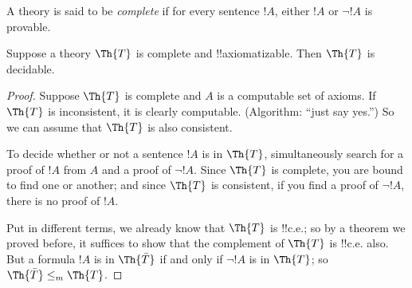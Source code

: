 \documentclass[../../../include/open-logic-section]{subfiles}
\begin{document}


A theory is said to be {\em complete} if for every sentence $!A$,
either $!A$ or $\lnot !A$ is provable.

\begin{lem}
Suppose a theory $\Th{T}$ is complete and !!{axiomatizable}. Then
$\Th{T}$ is decidable.
\end{lem}

\begin{proof}
Suppose $\Th{T}$ is complete and $A$ is a computable set of axioms.
If $\Th{T}$ is inconsistent, it is clearly computable. (Algorithm: ``just
say yes.'') So we can assume that $\Th{T}$ is also consistent.

To decide whether or not a sentence $!A$ is in $\Th{T}$, simultaneously
search for a proof of $!A$ from $A$ and a proof of $\lnot !A$. Since
$\Th{T}$ is complete, you are bound to find one or another; and since $\Th{T}$
is consistent, if you find a proof of $\lnot !A$, there is no proof
of $!A$.

Put in different terms, we already know that $\Th{T}$ is !!{c.e.}; so
by a theorem we proved before, it suffices to show that the complement
of $\Th{T}$ is !!{c.e.} also. But a formula $!A$ is in $\Th{\bar T}$ if and
only if $\lnot !A$ is in $\Th{T}$; so $\Th{\bar T} \leq_m \Th{T}$.
\end{proof}
\end{document}
